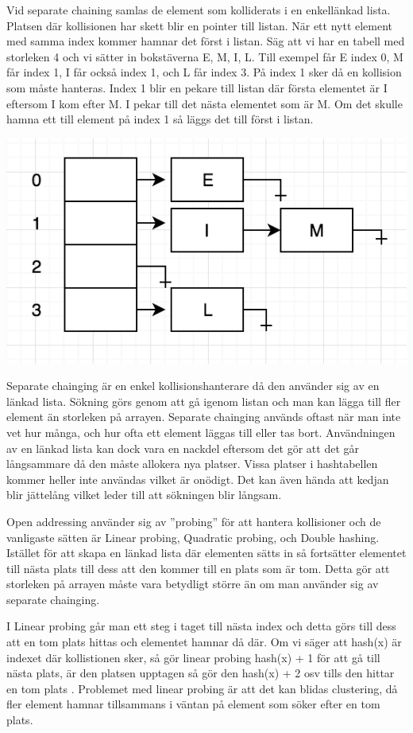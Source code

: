 \documentclass[a5paper,10pt,oneside]{article}
\begin{document}
Vid separate chaining samlas de element som kolliderats i en enkellänkad lista. Platsen där kollisionen har skett blir en pointer till listan. När ett nytt element med samma index kommer hamnar det först i listan. Säg att vi har en tabell med storleken 4 och vi sätter in bokstäverna E, M, I, L. Till exempel får E index 0, M får index 1, I får också index 1,  och L får index 3. På index 1 sker då en kollision som måste hanteras. Index 1 blir en pekare till listan där första elementet är I eftersom I kom efter M. I pekar till det nästa elementet som är M. Om det skulle hamna ett till element på index 1 så läggs det till först i listan.

\includegraphics[scale=1]{separate}

Separate chainging är en enkel kollisionshanterare då den använder sig av en länkad lista. Sökning görs genom att gå igenom listan och man kan lägga till fler element än storleken på arrayen. Separate chainging används oftast när man inte vet hur många, och hur ofta ett element läggas till eller tas bort. Användningen av en länkad lista kan dock vara en nackdel eftersom det gör att det går långsammare då den måste allokera nya platser. Vissa platser i hashtabellen kommer heller inte användas vilket är onödigt. Det kan även hända att kedjan blir jättelång vilket leder till att sökningen blir långsam.

Open addressing använder sig av ”probing” för att hantera kollisioner och de vanligaste sätten är Linear probing, Quadratic probing, och Double hashing. Istället för att skapa en länkad lista där elementen sätts in så fortsätter elementet till nästa plats till dess att den kommer till en plats som är tom. Detta gör att storleken på arrayen måste vara betydligt större än om man använder sig av separate chainging.

 I Linear probing går man ett steg i taget till nästa index och detta görs till dess att en tom plats hittas och elementet hamnar då där. Om vi säger att hash(x) är indexet där kollistionen sker, så gör linear probing hash(x) + 1 för att gå till nästa plats, är den platsen upptagen så gör den hash(x) + 2 osv tills den hittar en tom plats . Problemet med linear probing är att det kan blidas clustering, då fler element hamnar tillsammans i väntan på element som söker efter en tom plats. 
 
\end{document}
